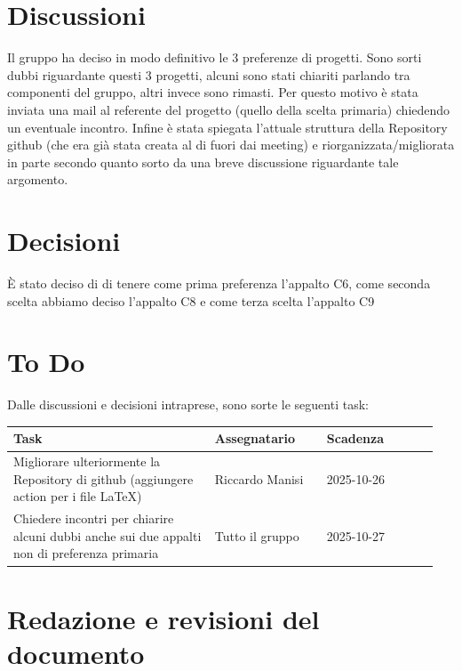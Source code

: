 \documentclass[a4paper,12pt]{article}
\begin{document}
\section{Discussioni}
Il gruppo ha deciso in modo definitivo le 3 preferenze di progetti. Sono sorti dubbi riguardante questi 3 progetti, alcuni sono stati chiariti parlando tra componenti del gruppo, altri invece sono rimasti. Per questo motivo è stata inviata una mail al referente del progetto (quello della scelta primaria) chiedendo un eventuale incontro. Infine è stata spiegata l'attuale struttura della Repository github (che era già stata creata al di fuori dai meeting) e riorganizzata/migliorata in parte secondo quanto sorto da una breve discussione riguardante tale argomento.

\section{Decisioni}
È stato deciso di di tenere come prima preferenza l'appalto C6, come seconda scelta abbiamo deciso l'appalto C8 e come terza scelta l'appalto C9

\section{To Do}
Dalle discussioni e decisioni intraprese, sono sorte le seguenti task:

\begin{center}
\small
\renewcommand{\arraystretch}{1.2} 
\begin{tabular}{|p{0.45\linewidth}|p{0.25\linewidth}|p{0.25\linewidth}|}
\hline
\rowcolor{gray!60} 
\textbf{Task} & \textbf{Assegnatario} & \textbf{Scadenza} \\
\hline
\rowcolor{white}
Migliorare ulteriormente la Repository di github (aggiungere action per i file LaTeX) & Riccardo Manisi & 2025-10-26 \\
\hline
\rowcolor{white}
Chiedere incontri per chiarire alcuni dubbi anche sui due appalti non di preferenza primaria & Tutto il gruppo & 2025-10-27 \\
\hline
\end{tabular}
\end{center}

\clearpage
\section{Redazione e revisioni del documento}
\end{document}
